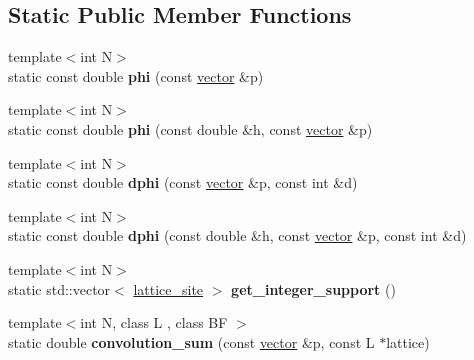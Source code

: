 \subsection*{Static Public Member Functions}
\begin{DoxyCompactItemize}
\item 
\mbox{\label{classsisl_1_1bcc__quintic__rdo_af269427e5d0bc33a12310befac01d1d4}} 
{\footnotesize template$<$int N$>$ }\\static const double {\bfseries phi} (const \hyperlink{namespacesisl_a2069bd5374a9be042ff3ce3306d41e1a}{vector} \&p)
\item 
\mbox{\label{classsisl_1_1bcc__quintic__rdo_a7a46cf64e560d3e6f03e387e64dc72d6}} 
{\footnotesize template$<$int N$>$ }\\static const double {\bfseries phi} (const double \&h, const \hyperlink{namespacesisl_a2069bd5374a9be042ff3ce3306d41e1a}{vector} \&p)
\item 
\mbox{\label{classsisl_1_1bcc__quintic__rdo_adde69990652ef24a1bbb985e71eee899}} 
{\footnotesize template$<$int N$>$ }\\static const double {\bfseries dphi} (const \hyperlink{namespacesisl_a2069bd5374a9be042ff3ce3306d41e1a}{vector} \&p, const int \&d)
\item 
\mbox{\label{classsisl_1_1bcc__quintic__rdo_a2c71c8ea07f3f34940f9771368b2ed2e}} 
{\footnotesize template$<$int N$>$ }\\static const double {\bfseries dphi} (const double \&h, const \hyperlink{namespacesisl_a2069bd5374a9be042ff3ce3306d41e1a}{vector} \&p, const int \&d)
\item 
\mbox{\label{classsisl_1_1bcc__quintic__rdo_a6522597766dee35b9d4bfef23385316b}} 
{\footnotesize template$<$int N$>$ }\\static std\+::vector$<$ \hyperlink{namespacesisl_acd18feee4026583db6185df2b25434aa}{lattice\+\_\+site} $>$ {\bfseries get\+\_\+integer\+\_\+support} ()
\item 
\mbox{\label{classsisl_1_1bcc__quintic__rdo_afdd086e42d3dc141aa8dd32b1de4acd3}} 
{\footnotesize template$<$int N, class L , class BF $>$ }\\static double {\bfseries convolution\+\_\+sum} (const \hyperlink{namespacesisl_a2069bd5374a9be042ff3ce3306d41e1a}{vector} \&p, const L $\ast$lattice)

\end{DoxyCompactItemize}
